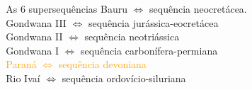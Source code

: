 \documentclass[10pt]{beamer} %
\begin{document}
\begin{frame}
\begin{columns}
\begin{column}{0.4\textwidth}
\begin{figure}
			\end{figure}
		\end{column}
		\begin{column}{0.75\textwidth}
			\begin{block}{As $6$ supersequências}
				Bauru $\Longleftrightarrow$  sequência neocretácea.\\
				Gondwana III $\Longleftrightarrow$ sequência jurássica-eocretácea\\
				Gondwana II $\Longleftrightarrow$ sequência neotriássica \\
				Gondwana I $\Longleftrightarrow$ sequência carbonífera-permiana\\ 
				\textcolor{orange}{Paraná $\Longleftrightarrow$ sequência devoniana}\\
				Rio Ivaí $\Longleftrightarrow$ sequência ordovício-siluriana\\
				\cite{Vail_1977,assine_1994,milani_orogenias_1998}
			\end{block}
		\end{column}
	\end{columns}
\end{frame}
\end{document}
